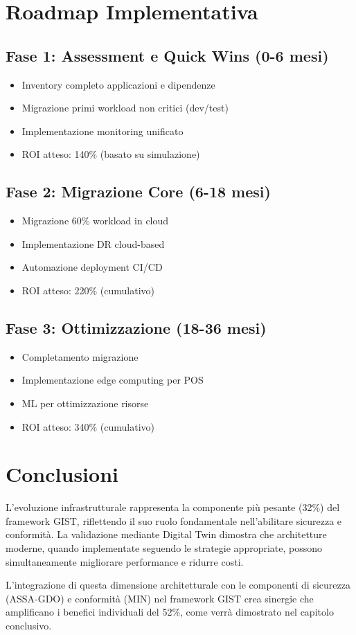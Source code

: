 \section{Roadmap Implementativa}

\subsection{Fase 1: Assessment e Quick Wins (0-6 mesi)}
\begin{itemize}
\item Inventory completo applicazioni e dipendenze
\item Migrazione primi workload non critici (dev/test)
\item Implementazione monitoring unificato
\item ROI atteso: 140\% (basato su simulazione)
\end{itemize}

\subsection{Fase 2: Migrazione Core (6-18 mesi)}
\begin{itemize}
\item Migrazione 60\% workload in cloud
\item Implementazione DR cloud-based
\item Automazione deployment CI/CD
\item ROI atteso: 220\% (cumulativo)
\end{itemize}

\subsection{Fase 3: Ottimizzazione (18-36 mesi)}
\begin{itemize}
\item Completamento migrazione
\item Implementazione edge computing per POS
\item ML per ottimizzazione risorse
\item ROI atteso: 340\% (cumulativo)
\end{itemize}

\section{Conclusioni}

L'evoluzione infrastrutturale rappresenta la componente più pesante (32\%) del framework GIST, riflettendo il suo ruolo fondamentale nell'abilitare sicurezza e conformità. La validazione mediante Digital Twin dimostra che architetture moderne, quando implementate seguendo le strategie appropriate, possono simultaneamente migliorare performance e ridurre costi.

L'integrazione di questa dimensione architetturale con le componenti di sicurezza (ASSA-GDO) e conformità (MIN) nel framework GIST crea sinergie che amplificano i benefici individuali del 52\%, come verrà dimostrato nel capitolo conclusivo.